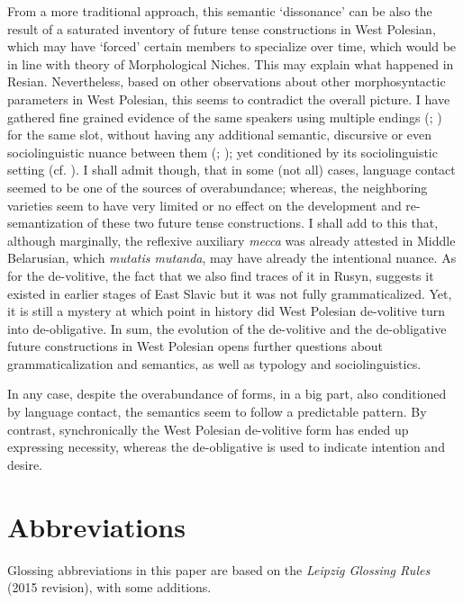 \documentclass[output=paper,colorlinks,citecolor=brown]{langscibook}
\begin{document}
From a more traditional approach, this semantic ‘dissonance’ can be also the result of a saturated inventory of future tense constructions in West Polesian, which may have ‘forced’ certain members to specialize over time, which would be in line with  theory of Morphological Niches. This may explain what happened in Resian. Nevertheless, based on other observations about other morphosyntactic parameters in West Polesian, this seems to contradict the overall picture. I have gathered fine grained evidence of the same speakers using multiple endings (\cite{roncero2021revisiting}; \cite{Roncero2022}) for the same slot, without having any additional semantic, discursive or even sociolinguistic nuance between them (\cite{BošnjakBoticaHržica2016}; \cite{Thornton2011}); yet conditioned by its sociolinguistic setting (cf. \cite{Dorian2010}). I shall admit though, that in some (not all) cases, language contact seemed to be one of the sources of overabundance; whereas, the neighboring varieties seem to have very limited or no effect on the development and re-semantization of these two future tense constructions. I shall add to this that, although marginally, the reflexive auxiliary \textit{mecca} was already attested in Middle Belarusian, which \textit{mutatis mutanda}, may have already the intentional nuance. As for the de-volitive, the fact that we also find traces of it in Rusyn, suggests it existed in earlier stages of East Slavic but it was not fully grammaticalized. Yet, it is still a mystery at which point in history did West Polesian de-volitive turn into de-obligative. In sum, the evolution of the de-volitive and the de-obligative future constructions in West Polesian opens further questions about grammaticalization and semantics, as well as typology and sociolinguistics.

In any case, despite the overabundance of forms, in a big part, also conditioned by language contact, the semantics seem to follow a predictable pattern. By contrast, synchronically the West Polesian de-volitive form has ended up expressing necessity, whereas the de-obligative is used to indicate intention and desire. 



\section*{Abbreviations}
Glossing abbreviations in this paper are based on the \textit{Leipzig Glossing Rules} (2015 revision), with some additions.\vspace{10pt}
\end{document}
